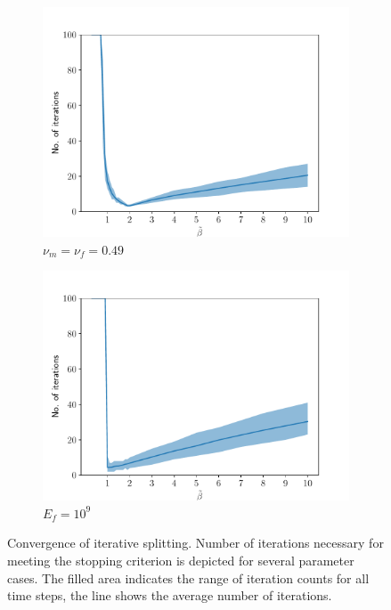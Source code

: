 \documentclass[a4paper]{article}
\numberwithin{equation}{section}
\begin{document}
\begin{figure}
\begin{subfigure}[b]{0.49\textwidth}
\centering
\includegraphics[width=\textwidth]{figures/conv_result_linear.yaml_dt_100_alpha_1_cond_9.81e-18_Er_6e+10_Ef_1e+06_nur_0.49_nuf_0.49.pdf}
\caption{$\nu_m=\nu_f=0.49$}
\end{subfigure}
% 
\begin{subfigure}[b]{0.49\textwidth}
\centering
\includegraphics[width=\textwidth]{figures/conv_result_linear.yaml_dt_100_alpha_1_cond_9.81e-18_Er_6e+10_Ef_1e+09_nur_0_nuf_0.pdf}
\caption{$E_f=10^{9}$}
\end{subfigure}
\caption{Convergence of iterative splitting. Number of iterations necessary for meeting the stopping criterion is depicted for several parameter cases. The filled area indicates the range of iteration counts for all time steps, the line shows the average number of iterations.}
\label{fig:test_iterations}
\end{figure}
\end{document}
